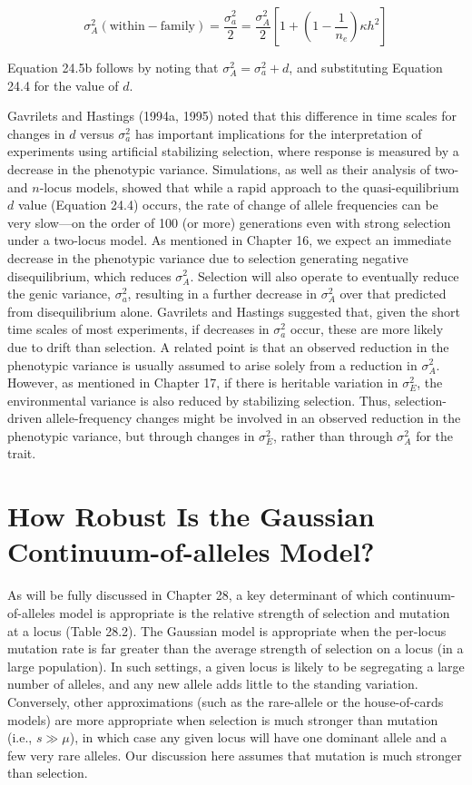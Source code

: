 \documentclass{article}
\begin{document}
\begin{equation}
\sigma_{A}^{2}(\mathrm{within-family})=\frac{\sigma_{a}^{2}}{2}=\frac{\sigma_{A}^{2}}{2}\left[1+\left(1-\frac{1}{n_{e}}\right)\kappa h^{2}\right]
\tag{24.5b}
\label{eq:24_5b}
\end{equation}

Equation 24.5b follows by noting that  $ \sigma_A^2 = \sigma_a^2 + d $, and substituting Equation 24.4 for the value of  $ d $.

Gavrilets and Hastings (1994a, 1995) noted that this difference in time scales for changes in $d$ versus $\sigma_a^2$ has important implications for the interpretation of experiments using artificial stabilizing selection, where response is measured by a decrease in the phenotypic variance. Simulations, as well as their analysis of two- and $n$-locus models, showed that while a rapid approach to the quasi-equilibrium $d$ value (Equation 24.4) occurs, the rate of change of allele frequencies can be very slow—on the order of 100 (or more) generations even with strong selection under a two-locus model. As mentioned in Chapter 16, we expect an immediate decrease in the phenotypic variance due to selection generating negative disequilibrium, which reduces $\sigma_A^2$. Selection will also operate to eventually reduce the genic variance, $\sigma_a^2$, resulting in a further decrease in $\sigma_A^2$ over that predicted from disequilibrium alone. Gavrilets and Hastings suggested that, given the short time scales of most experiments, if decreases in $\sigma_a^2$ occur, these are more likely due to drift than selection. A related point is that an observed reduction in the phenotypic variance is usually assumed to arise solely from a reduction in $\sigma_A^2$. However, as mentioned in Chapter 17, if there is heritable variation in $\sigma_E^2$, the environmental variance is also reduced by stabilizing selection. Thus, selection-driven allele-frequency changes might be involved in an observed reduction in the phenotypic variance, but through changes in $\sigma_E^2$, rather than through $\sigma_A^2$ for the trait.

\section{How Robust Is the Gaussian Continuum-of-alleles Model?}
As will be fully discussed in Chapter 28, a key determinant of which continuum-of-alleles model is appropriate is the relative strength of selection and mutation at a locus (Table 28.2). The Gaussian model is appropriate when the per-locus mutation rate is far greater than the average strength of selection on a locus (in a large population). In such settings, a given locus is likely to be segregating a large number of alleles, and any new allele adds little to the standing variation. Conversely, other approximations (such as the rare-allele or the house-of-cards models) are more appropriate when selection is much stronger than mutation (i.e.,  $ s \gg \mu $), in which case any given locus will have one dominant allele and a few very rare alleles. Our discussion here assumes that mutation is much stronger than selection.
\end{document}
